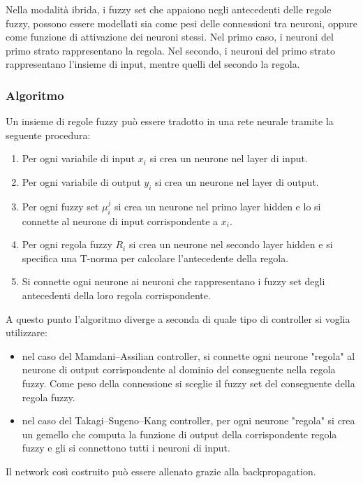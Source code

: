 \documentclass[10pt,a4paper]{article}
\begin{document}
Nella modalità ibrida, i fuzzy set che appaiono negli antecedenti delle regole fuzzy, possono essere modellati sia come pesi delle connessioni tra neuroni, oppure come funzione di attivazione dei neuroni stessi. Nel primo caso, i neuroni del primo strato rappresentano la regola. Nel secondo, i neuroni del primo strato rappresentano l'insieme di input, mentre quelli del secondo la regola.

\subsubsection{Algoritmo}

Un insieme di regole fuzzy può essere tradotto in una rete neurale tramite la seguente procedura:

\begin{enumerate}
\item{Per ogni variabile di input $x_i$ si crea un neurone nel layer di input.}
\item{Per ogni variabile di output $y_i$ si crea un neurone nel layer di output.}
\item{Per ogni fuzzy set $\mu_i^j$ si crea un neurone nel primo layer hidden e lo si connette al neurone di input corrispondente a $x_i$.}
\item{Per ogni regola fuzzy $R_i$ si crea un neurone nel secondo layer hidden e si specifica una T-norma per calcolare l'antecedente della regola.}
\item{Si connette ogni neurone ai neuroni che rappresentano i fuzzy set degli antecedenti della loro regola corrispondente.}
\end{enumerate} 

A questo punto l'algoritmo diverge a seconda di quale tipo di controller si voglia utilizzare:

\begin{itemize}
\item{nel caso del Mamdani–Assilian controller, si connette ogni neurone "regola" al neurone di output corrispondente al dominio del conseguente nella regola fuzzy. Come peso della connessione si sceglie il fuzzy set del conseguente della regola fuzzy.}
\item{nel caso del Takagi–Sugeno–Kang controller, per ogni neurone "regola" si crea un gemello che computa la funzione di output della corrispondente regola fuzzy e gli si connettono tutti i neuroni di input.}
\end{itemize}

Il network così costruito può essere allenato grazie alla backpropagation.
\end{document}
